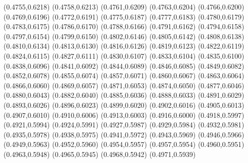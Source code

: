 \PST@Filltriangle(0.4755,0.6218)
\PST@Filltriangle(0.4758,0.6213)
\PST@Filltriangle(0.4761,0.6209)
\PST@Filltriangle(0.4763,0.6204)
\PST@Filltriangle(0.4766,0.6200)
\PST@Filltriangle(0.4769,0.6196)
\PST@Filltriangle(0.4772,0.6191)
\PST@Filltriangle(0.4775,0.6187)
\PST@Filltriangle(0.4777,0.6183)
\PST@Filltriangle(0.4780,0.6179)
\PST@Filltriangle(0.4783,0.6175)
\PST@Filltriangle(0.4786,0.6170)
\PST@Filltriangle(0.4788,0.6166)
\PST@Filltriangle(0.4791,0.6162)
\PST@Filltriangle(0.4794,0.6158)
\PST@Filltriangle(0.4797,0.6154)
\PST@Filltriangle(0.4799,0.6150)
\PST@Filltriangle(0.4802,0.6146)
\PST@Filltriangle(0.4805,0.6142)
\PST@Filltriangle(0.4808,0.6138)
\PST@Filltriangle(0.4810,0.6134)
\PST@Filltriangle(0.4813,0.6130)
\PST@Filltriangle(0.4816,0.6126)
\PST@Filltriangle(0.4819,0.6123)
\PST@Filltriangle(0.4822,0.6119)
\PST@Filltriangle(0.4824,0.6115)
\PST@Filltriangle(0.4827,0.6111)
\PST@Filltriangle(0.4830,0.6107)
\PST@Filltriangle(0.4833,0.6104)
\PST@Filltriangle(0.4835,0.6100)
\PST@Filltriangle(0.4838,0.6096)
\PST@Filltriangle(0.4841,0.6092)
\PST@Filltriangle(0.4844,0.6089)
\PST@Filltriangle(0.4846,0.6085)
\PST@Filltriangle(0.4849,0.6082)
\PST@Filltriangle(0.4852,0.6078)
\PST@Filltriangle(0.4855,0.6074)
\PST@Filltriangle(0.4857,0.6071)
\PST@Filltriangle(0.4860,0.6067)
\PST@Filltriangle(0.4863,0.6064)
\PST@Filltriangle(0.4866,0.6060)
\PST@Filltriangle(0.4869,0.6057)
\PST@Filltriangle(0.4871,0.6053)
\PST@Filltriangle(0.4874,0.6050)
\PST@Filltriangle(0.4877,0.6046)
\PST@Filltriangle(0.4880,0.6043)
\PST@Filltriangle(0.4882,0.6040)
\PST@Filltriangle(0.4885,0.6036)
\PST@Filltriangle(0.4888,0.6033)
\PST@Filltriangle(0.4891,0.6029)
\PST@Filltriangle(0.4893,0.6026)
\PST@Filltriangle(0.4896,0.6023)
\PST@Filltriangle(0.4899,0.6020)
\PST@Filltriangle(0.4902,0.6016)
\PST@Filltriangle(0.4905,0.6013)
\PST@Filltriangle(0.4907,0.6010)
\PST@Filltriangle(0.4910,0.6006)
\PST@Filltriangle(0.4913,0.6003)
\PST@Filltriangle(0.4916,0.6000)
\PST@Filltriangle(0.4918,0.5997)
\PST@Filltriangle(0.4921,0.5994)
\PST@Filltriangle(0.4924,0.5991)
\PST@Filltriangle(0.4927,0.5987)
\PST@Filltriangle(0.4929,0.5984)
\PST@Filltriangle(0.4932,0.5981)
\PST@Filltriangle(0.4935,0.5978)
\PST@Filltriangle(0.4938,0.5975)
\PST@Filltriangle(0.4941,0.5972)
\PST@Filltriangle(0.4943,0.5969)
\PST@Filltriangle(0.4946,0.5966)
\PST@Filltriangle(0.4949,0.5963)
\PST@Filltriangle(0.4952,0.5960)
\PST@Filltriangle(0.4954,0.5957)
\PST@Filltriangle(0.4957,0.5954)
\PST@Filltriangle(0.4960,0.5951)
\PST@Filltriangle(0.4963,0.5948)
\PST@Filltriangle(0.4965,0.5945)
\PST@Filltriangle(0.4968,0.5942)
\PST@Filltriangle(0.4971,0.5939)
